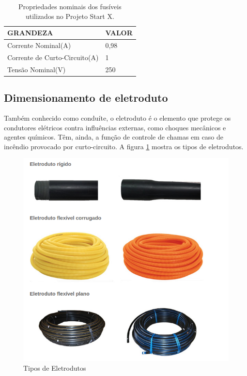 \begin{table}[h]
\centering
\begin{tabular}{|l|l|}
\hline
\rowcolor[HTML]{329A9D} 
GRANDEZA  & VALOR                                                   \\ \hline
Corrente Nominal(A) & 0,98 
\\ \hline
Corrente de Curto-Circuito(A) & 1
\\ \hline
Tensão Nominal(V)  & 250
\\ \hline
\end{tabular}
\caption{Propriedades nominais dos fusíveis utilizados no Projeto Start X.}
\label{propriedade-fusivel}
\end{table}

\subsection{Dimensionamento de eletroduto}

Também conhecido como conduíte, o eletroduto é o elemento que protege os condutores elétricos contra influências externas, como choques mecânicos e agentes químicos. Têm, ainda, a função de controle de chamas em caso de incêndio provocado por curto-circuito. 
A figura \ref{eletrodutos} mostra os tipos de eletrodutos.

\begin{figure}[h]
	\centering
	\includegraphics[scale=0.4]		{figuras/tipos_eletroduto.png}
	\caption{Tipos de Eletrodutos}
	\label{eletrodutos}
\end{figure}

